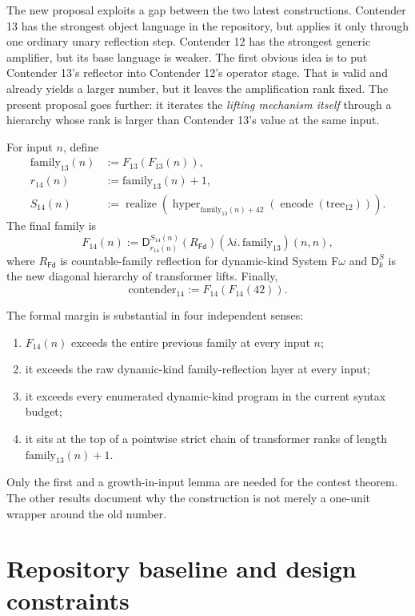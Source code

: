 \documentclass[11pt]{article}
\theoremstyle{definition}
\newcommand{\diag}{\mathsf{D}}
\newcommand{\Fd}{\mathsf{Fd}}
\begin{document}
The new proposal exploits a gap between the two latest constructions.  Contender 13 has the strongest object language in the repository, but applies it only through one ordinary unary reflection step.  Contender 12 has the strongest generic amplifier, but its base language is weaker.  The first obvious idea is to put Contender 13's reflector into Contender 12's operator stage.  That is valid and already yields a larger number, but it leaves the amplification rank fixed.  The present proposal goes further: it iterates the \emph{lifting mechanism itself} through a hierarchy whose rank is larger than Contender 13's value at the same input.

For input $n$, define
\begin{align*}
  \mathrm{family}_{13}(n) &:= F_{13}(F_{13}(n)),\\
  r_{14}(n) &:= \mathrm{family}_{13}(n)+1,\\
  S_{14}(n) &:= \operatorname{realize}\!\left(
    \operatorname{hyper}_{\mathrm{family}_{13}(n)+42}
    (\operatorname{encode}(\mathrm{tree}_{12}))\right).
\end{align*}
The final family is
\[
  F_{14}(n)
  := \diag^{S_{14}(n)}_{r_{14}(n)}(R_{\Fd})
       (\lambda i.\,\mathrm{family}_{13})(n,n),
\]
where $R_{\Fd}$ is countable-family reflection for dynamic-kind System F$\omega$ and $\diag^S_k$ is the new diagonal hierarchy of transformer lifts.  Finally,
\[
  \mathrm{contender}_{14}:=F_{14}(F_{14}(42)).
\]

The formal margin is substantial in four independent senses:
\begin{enumerate}[label=(\roman*)]
\item $F_{14}(n)$ exceeds the entire previous family at every input $n$;
\item it exceeds the raw dynamic-kind family-reflection layer at every input;
\item it exceeds every enumerated dynamic-kind program in the current syntax budget;
\item it sits at the top of a pointwise strict chain of transformer ranks of length $\mathrm{family}_{13}(n)+1$.
\end{enumerate}
Only the first and a growth-in-input lemma are needed for the contest theorem.  The other results document why the construction is not merely a one-unit wrapper around the old number.

\section{Repository baseline and design constraints}
\end{document}
